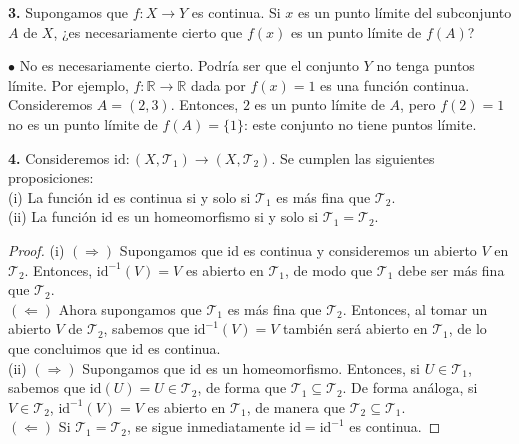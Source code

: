 \documentclass{article}
\begin{document}
\begin{mybox}
	\textbf{3. }  Supongamos que $f: X \rightarrow Y$ es continua. Si $x$ es un punto límite del subconjunto $A$ de $X$, ¿es necesariamente cierto que $f(x)$ es un punto límite de $f(A)$? 
\end{mybox}	

$\bullet$ No es necesariamente cierto. Podría ser que el conjunto $Y$ no tenga puntos límite. Por ejemplo, $f: \mathbb{R} \rightarrow \mathbb{R}$ dada por $f(x) = 1$ es una función continua. Consideremos $A = (2,3)$.  Entonces, $2$ es un punto límite de $A$, pero $f(2) = 1$ no es un punto límite de $f(A) = \{ 1 \}$: este conjunto no tiene puntos límite. 

\begin{mybox}
	\textbf{4. } Consideremos $\text{id}: (X, \mathcal{T}_{1}) \rightarrow (X, \mathcal{T}_{2})$. Se cumplen las siguientes proposiciones: \\
	
	(i) La función $\text{id}$ es continua si y solo si $\mathcal{T}_{1}$ es más fina que $\mathcal{T}_{2}$. \\
	
	(ii) La función id es un homeomorfismo si y solo si $\mathcal{T}_{1} = \mathcal{T}_{2}$.  
\end{mybox}	
\begin{proof}
	(i) $(\Rightarrow)$ Supongamos que id es continua y consideremos un abierto $V$ en $\mathcal{T}_{2}$. Entonces, $\text{id}^{-1}(V) = V$ es abierto en $\mathcal{T}_{1}$, de modo que $\mathcal{T}_{1}$ debe ser más fina que $\mathcal{T}_{2}$. \\
	$(\Leftarrow)$ Ahora supongamos que $\mathcal{T}_{1}$ es más fina que $\mathcal{T}_{2}$. Entonces, al tomar un abierto $V$ de $\mathcal{T}_{2}$, sabemos que $\text{id}^{-1}(V) = V$ también será abierto en $\mathcal{T}_{1}$, de lo que concluimos que id es continua. \\
	
	(ii) $(\Rightarrow)$ Supongamos que id es un homeomorfismo. Entonces, si $U \in \mathcal{T}_{1}$, sabemos que $\text{id}(U) = U \in \mathcal{T}_{2}$, de forma que $\mathcal{T}_{1} \subseteq \mathcal{T}_{2}$.   De forma análoga, si $V \in \mathcal{T}_{2}$, $\text{id}^{-1}(V) = V$ es abierto en $\mathcal{T}_{1}$, de manera que $\mathcal{T}_{2} \subseteq \mathcal{T}_{1}$. \\
	$(\Leftarrow)$ Si $\mathcal{T}_{1} = \mathcal{T}_{2}$, se sigue inmediatamente $\text{id} = \text{id}^{-1}$ es continua.  
\end{proof}
\end{document}
